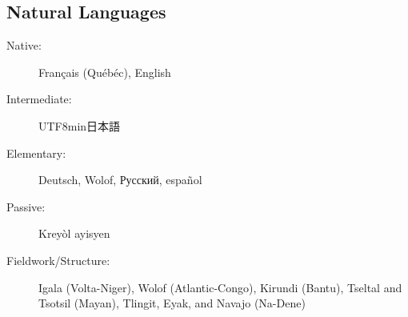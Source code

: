 \documentclass[margin,line]{resume}
\begin{document}
\begin{resume}


	\vspace{-0.9em}

	\section{\mysidestyle Natural Languages}\vspace{2mm}
	\begin{description}
		\item[Native:] Français (Qu\'{e}b\'{e}c), English
		\item[Intermediate:] \begin{CJK}{UTF8}{min}日本語\end{CJK}
		\item[Elementary:] Deutsch, Wolof, Русский, español
		\item[Passive:] Kreyòl ayisyen
		\item[Fieldwork/Structure:] Igala (Volta-Niger), Wolof (Atlantic-Congo), Kirundi (Bantu),
		      Tseltal and Tsotsil (Mayan), Tlingit, Eyak, and Navajo (Na-Dene)%
	\end{description}

	\BgThispage

\end{resume}
\end{document}
